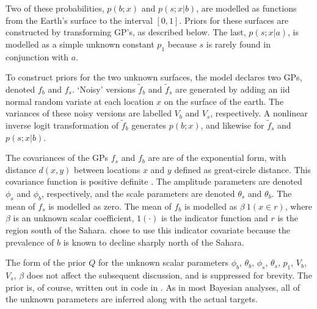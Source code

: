 \documentclass[article]{jss}
\begin{document}
Two of these probabilities, $p(b;x)$ and $p(s;x|b)$, are modelled as functions from the Earth's surface to the interval $[0,1]$. Priors for these surfaces are constructed by transforming GP's, as described below. The last, $p(s;x|a)$, is modelled as a simple unknown constant $p_1$ because $s$ is rarely found in conjunction with $a$.

To construct priors for the two unknown surfaces, the model declares two GPs, denoted $f_b$ and $f_s$. `Noisy' versions $\tilde f_b$ and $\tilde f_s$ are generated by adding an iid normal random variate at each location $x$ on the surface of the earth. The variances of these noisy versions are labelled $V_b$ and $V_s$, respectively. A nonlinear inverse logit transformation of $\tilde f_b$ generates $p(b;x)$, and likewise for $\tilde f_s$ and $p(s;x|b)$.

The covariances of the GPs $f_s$ and $f_b$ are are of the exponential form, with distance $d(x,y)$ between locations $x$ and $y$ defined as great-circle distance. This covariance function is positive definite \citep{spherical-validity}. The amplitude parameters are denoted $\phi_s$ and $\phi_b$, respectively, and the scale parameters are denoted $\theta_s$ and $\theta_b$. The mean of $f_s$ is modelled as zero. The mean of $f_b$ is modelled as $\beta\ 1(x\in r)$, where $\beta$ is an unknown scalar coefficient, $1(\cdot)$ is the indicator function and $r$ is the region south of the Sahara. \cite{Howes} chose to use this indicator covariate because the prevalence of $b$ is known to decline sharply north of the Sahara.

The form of the prior $Q$ for the unknown scalar parameters $\phi_b$, $\theta_b$, $\phi_s$, $\theta_s$, $p_1$, $V_b$, $V_s$, $\beta$ does not affect the subsequent discussion, and is suppressed for brevity. The prior is, of course, written out in code in . As in most Bayesian analyses, all of the unknown parameters are inferred along with the actual targets. 
\end{document}
